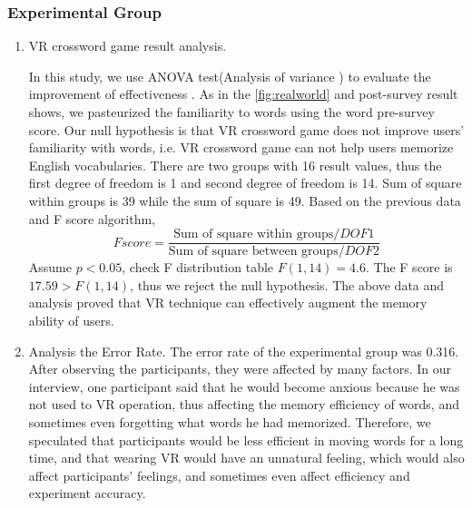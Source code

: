 \documentclass{vgtc}                          %
\begin{document}
\subsubsection{Experimental Group}
\begin{enumerate}
  \item VR crossword game result analysis. 
  
   In this study, we use ANOVA test(Analysis of variance
) to evaluate the improvement of effectiveness \cite{anderson2004regression}. As in the \ref{fig:realworld} and post-survey result shows, we pasteurized the familiarity to words using the word pre-survey score. Our null hypothesis is that VR crossword game does not improve users' familiarity with words, i.e. VR crossword game can not help users memorize English vocabularies. There are two groups with 16 result values, thus the first degree of freedom is 1 and second degree of freedom is 14. Sum of square within groups is 39 while the sum of square is 49. Based on the previous data and F score algorithm\cite{st1989analysis}\cite{chakraborty2016sequential}, 
$$Fscore=\frac{\textrm{Sum of square within groups}/DOF1}{\textrm{Sum of square between groups}/DOF2}$$
Assume $p<0.05$, check F distribution table $F(1,14)=4.6$. The F score is $17.59>F(1,14)$, thus we reject the null hypothesis. The above data and analysis proved that VR technique can effectively augment the memory ability of users.

    \item Analysis the Error Rate.
    The error rate of the experimental group was 0.316. After observing the participants, they were affected by many factors. In our interview, one participant said that he would become anxious because he was not used to VR operation, thus affecting the memory efficiency of words, and sometimes even forgetting what words he had memorized. Therefore, we speculated that participants would be less efficient in moving words for a long time, and that wearing VR would have an unnatural feeling, which would also affect participants' feelings, and sometimes even affect efficiency and experiment accuracy.
    
\end{enumerate}
\end{document}

